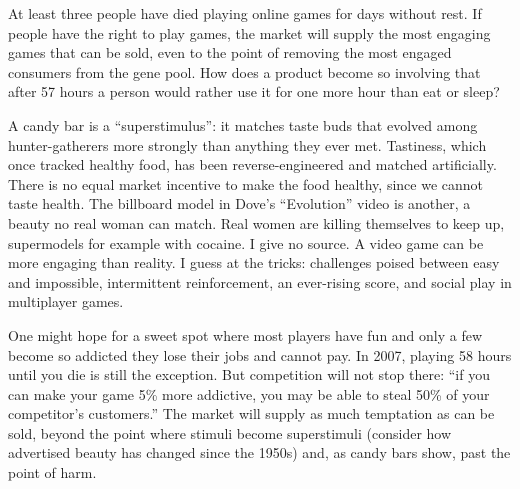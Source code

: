
At least three people have died playing online games for days without rest.  If people have the right to play games, the market will supply the most engaging games that can be sold, even to the point of removing the most engaged consumers from the gene pool. How does a product become so involving that after 57 hours a person would rather use it for one more hour than eat or sleep?

A candy bar is a ``superstimulus'': it matches taste buds that evolved among hunter-gatherers more strongly than anything they ever met. Tastiness, which once tracked healthy food, has been reverse-engineered and matched artificially. There is no equal market incentive to make the food healthy, since we cannot taste health.  The billboard model in Dove's ``Evolution'' video is another, a beauty no real woman can match. Real women are killing themselves to keep up, supermodels for example with cocaine. I give no source. A video game can be more engaging than reality. I guess at the tricks: challenges poised between easy and impossible, intermittent reinforcement, an ever-rising score, and social play in multiplayer games.

One might hope for a sweet spot where most players have fun and only a few become so addicted they lose their jobs and cannot pay. In 2007, playing 58 hours until you die is still the exception. But competition will not stop there: ``if you can make your game 5\% more addictive, you may be able to steal 50\% of your competitor's customers.'' The market will supply as much temptation as can be sold, beyond the point where stimuli become superstimuli (consider how advertised beauty has changed since the 1950s) and, as candy bars show, past the point of harm.

